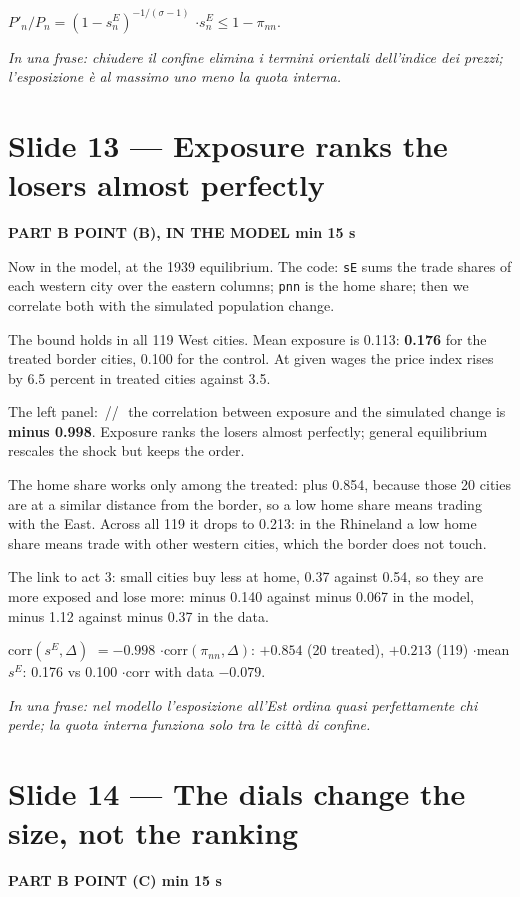 \documentclass[11pt,a4paper]{article}
\newcommand{\slide}[3]{\Needspace{14\baselineskip}\section{#1}\textcolor{unicared}{\small\bfseries\MakeUppercase{#3}\quad\textperiodcentered\quad #2}\par}
\newcommand{\idea}[1]{\par{\small\itshape\color{unicablue}In una frase: #1}\par}
\newcommand{\pause}{\textcolor{unicared}{\,/\!/\,}}
\begin{document}
\begin{nums}
$P'_n/P_n = (1-s^E_n)^{-1/(\sigma-1)}$ \quad$\cdot$\quad $s^E_n \le 1-\pi_{nn}$.
\end{nums}
\idea{chiudere il confine elimina i termini orientali dell'indice dei prezzi; l'esposizione è al massimo uno meno la quota interna.}

\slide{Slide 13 --- Exposure ranks the losers almost perfectly}{1 min 15 s}{Part B \textperiodcentered{} point (b), in the model}

\begin{say}
Now in the model, at the 1939 equilibrium. The code: \texttt{sE} sums the trade shares of each western city over the eastern columns; \texttt{pnn} is the home share; then we correlate both with the simulated population change.

The bound holds in all 119 West cities. Mean exposure is 0.113: \textbf{0.176} for the treated border cities, 0.100 for the control. At given wages the price index rises by 6.5 percent in treated cities against 3.5.

The left panel: \pause\ the correlation between exposure and the simulated change is \textbf{minus 0.998}. Exposure ranks the losers almost perfectly; general equilibrium rescales the shock but keeps the order.

The home share works only among the treated: plus 0.854, because those 20 cities are at a similar distance from the border, so a low home share means trading with the East. Across all 119 it drops to 0.213: in the Rhineland a low home share means trade with other western cities, which the border does not touch.

The link to act 3: small cities buy less at home, 0.37 against 0.54, so they are more exposed and lose more: minus 0.140 against minus 0.067 in the model, minus 1.12 against minus 0.37 in the data.
\end{say}

\begin{nums}
corr$(s^E,\Delta)$ $=-0.998$ \quad$\cdot$\quad corr$(\pi_{nn},\Delta)$: $+0.854$ (20 treated), $+0.213$ (119) \quad$\cdot$\quad mean $s^E$: 0.176 vs 0.100 \quad$\cdot$\quad corr with data $-0.079$.
\end{nums}
\idea{nel modello l'esposizione all'Est ordina quasi perfettamente chi perde; la quota interna funziona solo tra le città di confine.}

\slide{Slide 14 --- The dials change the size, not the ranking}{1 min 15 s}{Part B \textperiodcentered{} point (c)}
\end{document}
